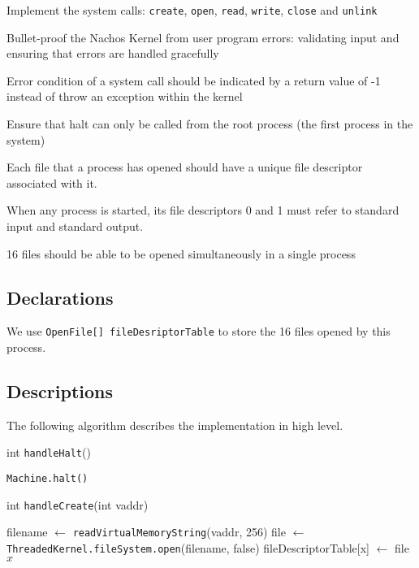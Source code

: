 \documentclass{article}
\begin{document}
\begin{spacing}{1.1}
\begin{asparaitem}
\item Implement the system calls: \texttt{create}, \texttt{open}, \texttt{read}, \texttt{write}, \texttt{close} and \texttt{unlink}
\item Bullet-proof the Nachos Kernel from user program errors: validating input and ensuring that errors are handled gracefully
\item Error condition of a system call should be indicated by a return value of -1 instead of throw an exception within the kernel
\item Ensure that halt can only be called from the root process (the first process in the system)
\item Each file that a process has opened should have a unique file descriptor associated with it.
\item When any process is started, its file descriptors 0 and 1 must refer to standard input and standard output.
\item 16 files should be able to be opened simultaneously in a single process
\end{asparaitem}

\subsection{Declarations}

We use \texttt{OpenFile[] fileDesriptorTable} to store the 16 files opened by this process.

\subsection{Descriptions}

The following algorithm describes the implementation in high level.

\begin{algorithm}
  \caption{int \texttt{handleHalt}()}
\begin{algorithmic}[1]
  \ENDIF
  \STATE \texttt{Machine.halt()}
\end{algorithmic}
\end{algorithm}

\begin{algorithm}
  \caption{int \texttt{handleCreate}(int vaddr)}
\begin{algorithmic}[1]
  \ENDIF
  \STATE filename $\leftarrow$ \texttt{readVirtualMemoryString}(vaddr, 256)
  \ENDIF
    \STATE file $\leftarrow$ \texttt{ThreadedKernel.fileSystem.open}(filename, false)
    \STATE fileDescriptorTable[x] $\leftarrow$ file
    \RETURN $x$
  \ELSE
  \ENDIF
\end{algorithmic}
\end{algorithm}


\end{spacing}
\end{document}
